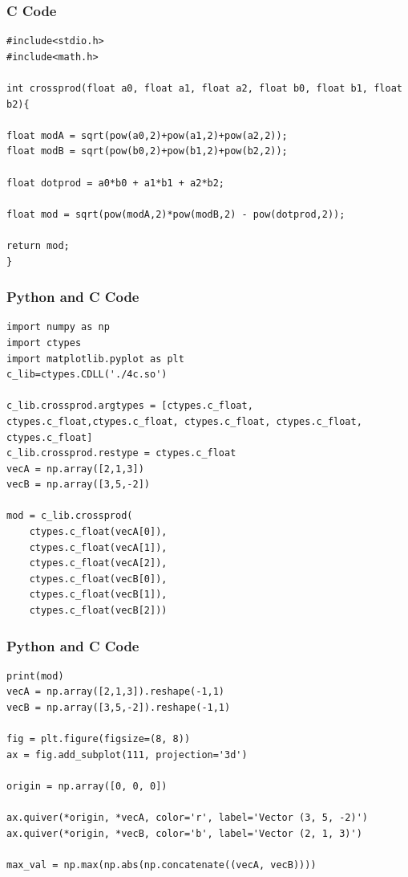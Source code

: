 \documentclass{beamer}
\begin{document}
\begin{frame}[fragile]
\frametitle{C Code}
\begin{lstlisting}
#include<stdio.h>
#include<math.h>

int crossprod(float a0, float a1, float a2, float b0, float b1, float b2){

float modA = sqrt(pow(a0,2)+pow(a1,2)+pow(a2,2));
float modB = sqrt(pow(b0,2)+pow(b1,2)+pow(b2,2));

float dotprod = a0*b0 + a1*b1 + a2*b2;

float mod = sqrt(pow(modA,2)*pow(modB,2) - pow(dotprod,2));

return mod;
}
\end{lstlisting}

\end{frame}

\begin{frame}[fragile]
\frametitle{Python and C Code}

\begin{lstlisting}
import numpy as np
import ctypes
import matplotlib.pyplot as plt
c_lib=ctypes.CDLL('./4c.so')

c_lib.crossprod.argtypes = [ctypes.c_float, ctypes.c_float,ctypes.c_float, ctypes.c_float, ctypes.c_float, ctypes.c_float]
c_lib.crossprod.restype = ctypes.c_float
vecA = np.array([2,1,3])
vecB = np.array([3,5,-2])

mod = c_lib.crossprod(
    ctypes.c_float(vecA[0]),
    ctypes.c_float(vecA[1]), 
    ctypes.c_float(vecA[2]),
    ctypes.c_float(vecB[0]), 
    ctypes.c_float(vecB[1]),
    ctypes.c_float(vecB[2]))
\end{lstlisting}

\end{frame}

\begin{frame}[fragile]
\frametitle{Python and C Code}
\begin{lstlisting}
print(mod)
vecA = np.array([2,1,3]).reshape(-1,1)
vecB = np.array([3,5,-2]).reshape(-1,1)

fig = plt.figure(figsize=(8, 8))
ax = fig.add_subplot(111, projection='3d')

origin = np.array([0, 0, 0])

ax.quiver(*origin, *vecA, color='r', label='Vector (3, 5, -2)')
ax.quiver(*origin, *vecB, color='b', label='Vector (2, 1, 3)')

max_val = np.max(np.abs(np.concatenate((vecA, vecB))))
\end{lstlisting}

\end{frame}
\end{document}

